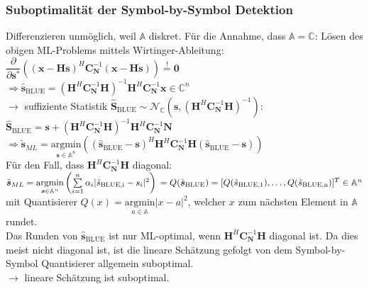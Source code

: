 \documentclass[a4paper,landscape,6pt]{article}
\newcommand{\ma}[1]{\ensuremath{\boldsymbol {#1}}}								%
\renewcommand{\vec}[1]{\ensuremath{\boldsymbol {#1}}}							%
\begin{document}
\begin{multicols}{3}
\subsubsection*{Suboptimalität der Symbol-by-Symbol Detektion}
Differenzieren unmöglich, weil $\mathbb{A}$ diskret. Für die Annahme, dass $\mathbb{A} = \mathbb{C}$: Lösen des obigen ML-Problems mittels Wirtinger-Ableitung:\\
$\dfrac{\partial}{\partial \vec s^*}\left( (\vec x - \ma H \vec s)^H \ma C_{\vec N}^{-1} (\vec x - \ma H \vec s) \right) \overset{!}{=} \vec 0$\\
$\Rightarrow \hat{\vec s}_{\text{BLUE}} = (\ma H ^H \ma C_{\vec N}^{-1} \ma H)^{-1} \ma H ^H \ma C_{\vec N}^{-1} \vec x \in \mathbb{C}^n$\\
$\rightarrow$ suffiziente Statistik $\hat{\vec S}_{\text{BLUE}} \sim \mathcal{N}_{\mathbb{C}}(\vec s, (\ma H ^H \ma C_{\vec N}^{-1} \ma H)^{-1})$:\\ 
$\hat{\vec S}_{\text{BLUE}} = \vec s + (\ma H ^H \ma C_{\vec N}^{-1} \ma H)^{-1} \ma H ^H \ma C_{\vec N}^{-1} \vec N $\\
$\Rightarrow \tilde{\vec s}_{ML} = \underset{\vec s \in \mathbb{A}^n}{\text{argmin}} \left( (\hat{\vec s}_{\text{BLUE}} - \vec s)^H \ma H^H \ma C_{\vec N}^{-1}\ma H (\hat{\vec s}_{\text{BLUE}} - \vec s) \right)$\\
Für den Fall, dass $\ma H^H \ma C_{\vec N}^{-1}\ma H$ diagonal:\\
$\tilde{\vec s}_{ML} = \underset{\vec s \in \mathbb{A}^n}{\text{argmin}} \left( \sum\limits_{i=1}^n \alpha_i|\hat s_{\text{BLUE,i}} - s_i|^2 \right) \\ = Q(\hat{\vec s}_{\text{BLUE}}) = [Q(\hat s_{\text{BLUE,1}}), \dots ,Q(\hat s_{\text{BLUE,n}})]^T \in \mathbb{A}^n$\\
mit Quantisierer $Q(x)=\underset{a \in \mathbb{A}}{\text{argmin}} |x-a|^2$, welcher $x$ zum nächsten Element in $\mathbb{A}$ rundet.\\
Das Runden von $\hat{\vec s}_{\text{BLUE}}$ ist nur ML-optimal, wenn $\ma H^H \ma C_{\vec N}^{-1}\ma H$ diagonal ist. Da dies meist nicht diagonal ist, ist die lineare Schätzung gefolgt von dem Symbol-by-Symbol Quantisierer allgemein suboptimal.\\ $\rightarrow$ lineare Schätzung ist suboptimal.

\end{multicols}
\end{document}
